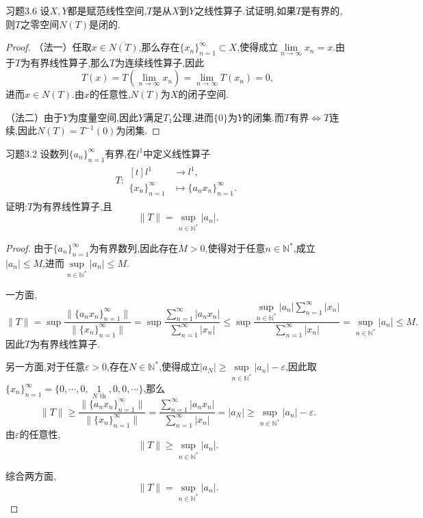 \documentclass[lang = cn, scheme = chinese]{elegantbook}
\begin{document}
	\chapter{}
	
	\begin{proposition}{习题3.6}
		设$X,Y$都是赋范线性空间,$T$是从$X$到$Y$之线性算子.试证明,如果$T$是有界的,则$T$之零空间$N(T)$是闭的.
	\end{proposition}
	
	\begin{proof}
		（法一）任取$x\in\overline{N(T)}$,那么存在$\{ x_n \}_{n=1}^{\infty}\subset X$,使得成立$\lim\limits_{n\to\infty}x_n=x$.由于$T$为有界线性算子,那么$T$为连续线性算子,因此
		$$
		T(x)=T\left(\lim_{n\to\infty}x_n\right)=\lim_{n\to\infty}T(x_n)=0,
		$$
		进而$x\in N(T)$.由$x$的任意性,$N(T)$为$X$的闭子空间.
		
		（法二）由于$Y$为度量空间,因此$Y$满足$T_1$公理,进而$\{0\}$为$Y$的闭集.而$T$有界$\iff T$连续,因此$N(T)=T^{-1}(0)$为闭集.
		
	\end{proof}
	
	\begin{proposition}{习题3.2}
		设数列$\{a_n\}_{n=1}^\infty$有界,在$l^1$中定义线性算子
		\begin{align*}
			T:\begin{aligned}[t]
				l^1&\longrightarrow l^1,\\
				\{ x_n \}_{n=1}^{\infty}&\longmapsto \{ a_nx_n \}_{n=1}^{\infty}.
			\end{aligned}
		\end{align*}
		证明:$T$为有界线性算子,且
		$$
		\|T\|=\sup_{n\in\mathbb{N}^*}|a_n|.
		$$
	\end{proposition}
	
	\begin{proof}
		由于$\{ a_n \}_{n=1}^{\infty}$为有界数列,因此存在$M>0$,使得对于任意$n\in\mathbb{N}^*$,成立$|a_n|\le M$,进而$\sup\limits_{n\in\mathbb{N}^*}|a_n|\le M$.
		
		一方面,
		$$
		\|T\|=\sup\frac{\|\{ a_nx_n \}_{n=1}^{\infty}\|}{\|\{ x_n \}_{n=1}^{\infty}\|}
		=\sup\frac{\displaystyle\sum_{n=1}^{\infty}|a_nx_n|}{\displaystyle\sum_{n=1}^{\infty}|x_n|}
		\le \sup\frac{\displaystyle\sup_{n\in\mathbb{N}^*}|a_n|\sum_{n=1}^{\infty}|x_n|}{\displaystyle\sum_{n=1}^{\infty}|x_n|}=\sup_{n\in\mathbb{N}^*}|a_n|\le M.
		$$
		因此$T$为有界线性算子.
		
		另一方面,对于任意$\varepsilon>0$,存在$N\in\mathbb{N}^*$,使得成立$|a_N|\ge \sup\limits_{n\in\mathbb{N}^*}|a_n|-\varepsilon$,因此取$\{ x_n \}_{n=1}^\infty=\{ 0,\cdots,0,\mathop{1}\limits_{N \text{ th}},0,0,\cdots \}$,那么
		$$
		\|T\|
		\ge\frac{\|\{ a_nx_n \}_{n=1}^{\infty}\|}{\|\{ x_n \}_{n=1}^{\infty}\|}
		=\frac{\displaystyle\sum_{n=1}^{\infty}|a_nx_n|}{\displaystyle\sum_{n=1}^{\infty}|x_n|}
		=|a_N|\ge \sup\limits_{n\in\mathbb{N}^*}|a_n|-\varepsilon.
		$$
		由$\varepsilon$的任意性,
		$$
		\|T\|
		\ge \sup\limits_{n\in\mathbb{N}^*}|a_n|.
		$$
		
		综合两方面,
		$$
		\|T\|=\sup_{n\in\mathbb{N}^*}|a_n|.
		$$
	\end{proof}
	
\end{document}
